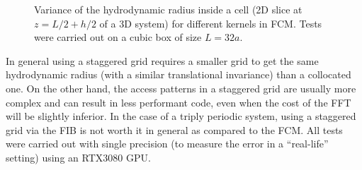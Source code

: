 \documentclass[twoside,openright,titlepage,numbers=noenddot,%
headinclude,footinclude,cleardoublepage=empty,abstract=on,
BCOR=5mm,fontsize=11pt, dvipsnames, paper=b5
]{scrreprt}
\newcommand{\gpu}{\gls{GPU}\xspace}
\begin{document}
\begin{figure}[H]
  \label{fig:ibm_gauss10pt}
  \caption[ ]{Variance of the hydrodynamic radius inside a cell (2D slice at $z=L/2+h/2$ of a 3D system) for different kernels in \gls{FCM}. Tests were carried out on a cubic box of size $L=32a$.} \label{fig:ibmvar}
\end{figure}

In general using a staggered grid requires a smaller grid to get the same hydrodynamic radius (with a similar translational invariance) than a collocated one. On the other hand, the access patterns in a staggered grid are usually more complex and can result in less performant code, even when the cost of the FFT will be slightly inferior. In the case of a triply periodic system, using a staggered grid via the \gls{FIB} is not worth it in general as compared to the \gls{FCM}.
All tests were carried out with single precision (to measure the error in a ``real-life'' setting) using an RTX3080 \gpu.


%

\newpage
\cleardoublepage
\end{document}
